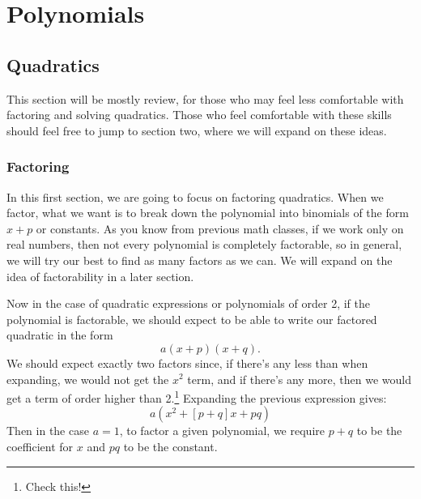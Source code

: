 \edef\mychapter{Polynomials}
\edef\mychapterdate{June 23, 2024}

\chapter{\mychapter}

\section{Quadratics}
This section will be mostly review, for those who may feel less comfortable with factoring and solving quadratics.
Those who feel comfortable with these skills should feel free to jump to section two, where we will expand on these ideas.
\subsection{Factoring}
In this first section, we are going to focus on factoring quadratics.
When we factor, what we want is to break down the polynomial into binomials of the form $x+p$ or constants.
As you know from previous math classes, if we work only on real numbers, then not every polynomial is completely factorable, so in general, we will try our best to find as many factors as we can. We will expand on the idea of factorability in a later section.

Now in the case of quadratic expressions or polynomials of order 2, if the polynomial is factorable, we should expect to be able to write our factored quadratic in the form
$$a(x+p)(x+q).$$
We should expect exactly two factors since, if there's any less than when expanding, we would not get the $x^2$ term, and if there's any more, then we would get a term of order higher than 2.\footnote{Check this!}
Expanding the previous expression gives:
$$a(x^2+[p+q]x+pq)$$
Then in the case $a=1$, to factor a given polynomial, we require $p+q$ to be the coefficient for $x$ and $pq$ to be the constant.

